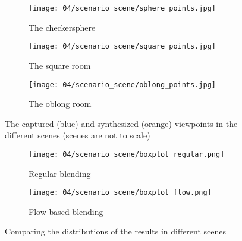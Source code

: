 \begin{figure}
\centering
    \hfill
    \begin{subfigure}[b]{0.4\textwidth}
            \centering
            \texttt{[image: 04/scenario\_scene/sphere\_points.jpg]}
            \caption{The checkersphere}
    \end{subfigure}%
    \hfill
    \begin{subfigure}[b]{0.4\textwidth}
            \centering
            \texttt{[image: 04/scenario\_scene/square\_points.jpg]}
            \caption{The square room}
    \end{subfigure}
    \hfill
    \hfill

    \hfill
    \begin{subfigure}[b]{0.4\textwidth}
            \centering
            \texttt{[image: 04/scenario\_scene/oblong\_points.jpg]}
            \caption{The oblong room}
    \end{subfigure}%
    \hfill
    \hfill
  \caption[The captured and synthesized viewpoints in the different scenes]{The captured (blue) and synthesized (orange) viewpoints in the different scenes (scenes are not to scale)} \label{fig:scene_setup}
\end{figure}

\begin{figure}
\centering
    \hfill
    \begin{subfigure}[b]{0.45\textwidth}
            \centering
            \texttt{[image: 04/scenario\_scene/boxplot\_regular.png]}
            \caption{Regular blending}
    \end{subfigure}
    \hfill
    \begin{subfigure}[b]{0.45\textwidth}
            \centering
            \texttt{[image: 04/scenario\_scene/boxplot\_flow.png]}
            \caption{Flow-based blending}
    \end{subfigure}
    \hfill
  \caption{Comparing the distributions of the results in different scenes}
  \label{fig:scene_boxplot_split}
\end{figure}

